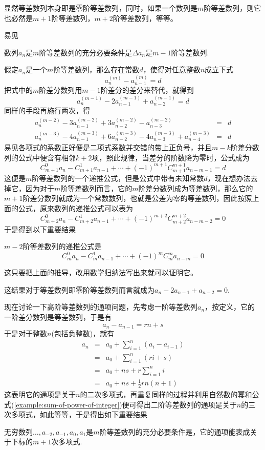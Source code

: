 显然等差数列本身即是零阶等差数列，同时，如果一个数列是$m$阶等差数列，则它也必然是$m+1$阶等差数列，$m+2$阶等差数列，等等。

易见
\begin{theorem}
  数列$a_n$是$m$阶等差数列的充分必要条件是$\Delta a_n$是$m-1$阶等差数列.
\end{theorem}

假定$a_n$是一个$m$阶等差数列，那么存在常数$d$，使得对任意整数$n$成立下式
\[ a_n^{(m)} - a_{n-1}^{(m)} = d \]
把式中的$m$阶差分数列用$m-1$阶差分的差分来替代，就得到
\[ a_n^{(m-1)}-2a_{n-1}^{(m-1)}+a_{n-2}^{(m-1)} = d \]
同样的手段再施行两次，得
\begin{eqnarray*}
 a_n^{(m-2)}-3a_{n-1}^{(m-2)}+3a_{n-2}^{(m-2)}-a_{n-3}^{(m-2)} & = & d  \\
 a_n^{(m-3)}-4a_{n-1}^{(m-3)}+6a_{n-2}^{(m-3)}-4a_{n-3}^{(m-3)}+a_{n-4}^{(m-3)} & = & d 
\end{eqnarray*}
易见各项式的系数正好便是二项式系数并交错的带上正负号，并且$m-k$阶差分数列的公式中便含有相邻$k+2$项，照此规律，当差分的阶数降为零时，公式成为
\[ C_{m+1}^0a_n-C_{m+1}^1a_{n-1}+\cdots+(-1)^{m+1}C_{m+1}^{m+1}a_{n-m-1} = d \]
这便是$m$阶等差数列的一个递推公式，但是公式中带有未知常数$d$，现在想办法去掉它，因为对于$m$阶等差数列而言，它的$m$阶差分数列成为等差数列，那么它的$m+1$阶差分数列就成为一个常数数列，也就是公差为零的等差数列，因此按照上面的公式，原来数列的递推公式可以表为
\[ C_{m+2}^0a_n-C_{m+2}^1a_{n-1}+\cdots+(-1)^{m+2}C_{m+2}^{m+2}a_{n-m-2} = 0 \]
于是得到以下重要结果
\begin{theorem}
  \label{theorem:recursive-for-high-level-common-difference-sequence}
  $m-2$阶等差数列的递推公式是
\[ C_m^0a_n-C_m^1a_{n-1}+\cdots+(-1)^mC_m^ma_{n-m} = 0 \]
\end{theorem}
这只要把上面的推导，改用数学归纳法写出来就可以证明它。

这结果对于等差数列即零阶等差数列而言就成为$a_n-2a_{n-1}+a_{n-2}=0$.

现在讨论一下高阶等差数列的通项问题，先考虑一阶等差数列$a_n$，按定义，它的一阶差分数列是等差数列，于是有
\[ a_n - a_{n-1} = rn+s \]
于是对于整数$n$(包括负整数)，就有
\begin{eqnarray*}
  a_n & = & a_0 + \sum_{i=1}^n(a_i-a_{i-1}) \\
      & = &  a_0 + \sum_{i=1}^n(ri+s) \\
      & = &  a_0 + ns + r\sum_{i=1}^n i \\
  & = & a_0 + ns + \frac{1}{2}rn(n+1)
\end{eqnarray*}
这表明它的通项是关于$n$的二次多项式，再重复同样的过程并利用自然数的幂和公式(\autoref{example:sum-of-power-of-integer})便可得出二阶等差数列的通项是关于$n$的三次多项式，如此等等，于是得出如下重要结果
\begin{theorem}
  \label{theorem:common-formular-for-high-level-common-difference-sequence}
  无穷数列$\ldots,a_{-2},a_{-1},a_0,a_1$是$m$阶等差数列的充分必要条件是，它的通项能表成关于下标的$m+1$次多项式.
\end{theorem}

